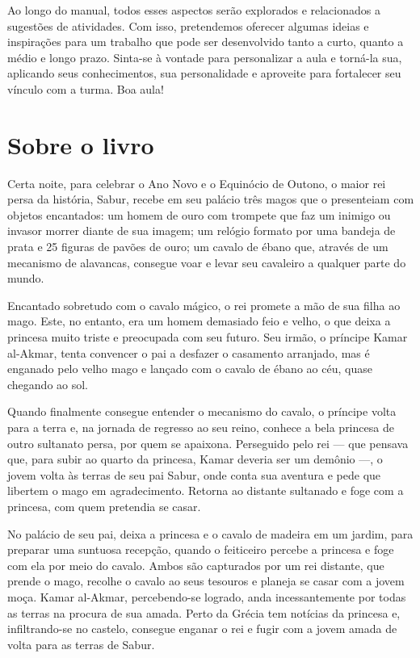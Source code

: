 \documentclass[11pt]{extarticle}
\begin{document}
Ao longo do manual, todos esses aspectos serão explorados e relacionados a sugestões de atividades. Com isso, pretendemos oferecer algumas ideias e inspirações para um trabalho que pode ser desenvolvido tanto a curto, quanto a médio e longo prazo. Sinta-se à vontade para personalizar a aula e torná-la sua, aplicando seus conhecimentos, sua 
personalidade e aproveite para fortalecer seu vínculo com a turma.
Boa aula!

\section{Sobre o livro}
Certa noite, para celebrar o Ano Novo e o Equinócio de Outono, o maior rei persa da história, Sabur, recebe em seu palácio três magos que o presenteiam com objetos encantados: um homem de ouro com trompete que faz um inimigo ou invasor morrer diante de sua imagem; um relógio formato por uma bandeja de prata e 25 figuras de pavões de ouro; um cavalo de ébano que, através de um mecanismo de alavancas, consegue voar e levar seu cavaleiro a qualquer parte do mundo.

Encantado sobretudo com o cavalo mágico, o rei promete a mão de sua filha ao mago. Este, no entanto, era um homem demasiado feio e velho, o que deixa a princesa muito triste e preocupada com seu futuro. Seu irmão, o príncipe Kamar al-Akmar, tenta convencer o pai a desfazer o casamento arranjado, mas é enganado pelo velho mago e lançado com o cavalo de ébano ao céu, quase chegando ao sol.

Quando finalmente consegue entender o mecanismo do cavalo, o príncipe volta para a terra e, na jornada de regresso ao seu reino, conhece a bela princesa de outro sultanato persa, por quem se apaixona. Perseguido pelo rei --- que pensava que, para subir ao quarto da princesa, Kamar deveria ser um demônio ---, o jovem volta às terras de seu pai Sabur, onde conta sua aventura e pede que libertem o mago em agradecimento. Retorna ao distante sultanado e foge com a princesa, com quem pretendia se casar.

No palácio de seu pai, deixa a princesa e o cavalo de madeira em um jardim, para preparar uma suntuosa recepção, quando o feiticeiro percebe a princesa e foge com ela por meio do cavalo. Ambos são capturados por um rei distante, que prende o mago, recolhe o cavalo ao seus tesouros e planeja se casar com a jovem moça. Kamar al-Akmar, percebendo-se logrado, anda incessantemente por todas as terras na procura de sua amada. Perto da Grécia tem notícias da princesa e, infiltrando-se no castelo, consegue enganar o rei e fugir com a jovem amada de volta para as terras de Sabur.
\end{document}
